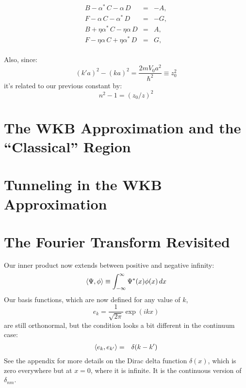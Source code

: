 \documentclass[12pt]{book}
\begin{document}
\begin{eqnarray*}
B -      \alpha^* \, C  -       \alpha     \, D &=& -A, \\
F -      \alpha   \, C  -       \alpha^*   \, D &=& -G, \\
B + \eta \alpha^* \, C  -  \eta \alpha     \, D &=&  A, \\
F - \eta \alpha   \, C  +  \eta \alpha^*   \, D &=&  G, \\
\end{eqnarray*}





Also, since:
$$(k'a)^2 - (ka)^2 = \frac{2mV_0a^2}{\hbar^2} \equiv z_0^2$$
it's related to our previous constant by:
$$n^2-1 = (z_0/z)^2$$









\section{The WKB Approximation and the ``Classical'' Region}

\section{Tunneling in the WKB Approximation }


\section{The Fourier Transform Revisited}

Our inner product now extends between positive and negative infinity:
\begin{equation}
\braket{\Psi, \phi} \equiv \int_{-\infty}^{\infty} \Psi^*(x) \phi(x) \, dx
\end{equation}
Our basis functions, which are now defined for any value of $k$,
\begin{equation}
e_k = \frac{1}{\sqrt{2\pi}} \exp(i k x)
\end{equation}
are still orthonormal, but the condition looks a bit different in the continuum case:
\begin{eqnarray*}
\braket{e_k, e_{k'}} &=& \delta(k-k')
\end{eqnarray*}
See the appendix for more details on the Dirac delta function $\delta(x)$, which is zero everywhere but at $x=0$, where it is infinite.  It is the continuous version of $\delta_{nm}$.
\end{document}
